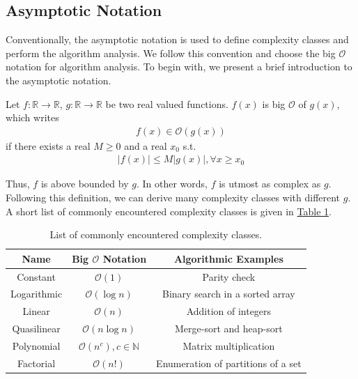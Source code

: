 \subsection*{Asymptotic Notation}
Conventionally, the asymptotic notation is used to define complexity classes and perform the algorithm analysis. 
We follow this convention and choose the big $\mathcal{O}$ notation for algorithm analysis. To begin with, we present a brief
introduction to the asymptotic notation.
\begin{definition}
    Let $f: \mathbb{R} \rightarrow \mathbb{R}$, $g: \mathbb{R} \rightarrow \mathbb{R}$ be two real valued functions. 
    $f(x)$ is big $\mathcal{O}$ of $g(x)$, which writes
    \begin{align*}
        f(x) \in \mathcal{O}(g(x))
    \end{align*}
    if there exists a real $M \geq 0$ and a real $x_0$ s.t. 
    \begin{align*}
        |f(x)| \leq M |g(x)|, \forall x \geq x_0
    \end{align*}
\end{definition}
Thus, $f$ is above bounded by $g$. In other words, $f$ is utmost as complex as $g$. Following this definition, 
we can derive many complexity classes with different $g$. A short list of commonly encountered complexity classes is given 
in \hyperref[table:1]{Table 1}.
\begin{table}[H]
    \centering 
    \begin{tabular}{|| c | c | c ||}
        \hline 
        Name & Big $\mathcal{O}$ Notation & Algorithmic Examples \\ 
        \hline 
        Constant & $\mathcal{O}(1)$ & Parity check\\
        \hline 
        Logarithmic & $\mathcal{O}(\log n)$ & Binary search in a sorted array \\ 
        \hline 
        Linear & $\mathcal{O}(n)$ & Addition of integers \\
        \hline 
        Quasilinear & $\mathcal{O}(n\log n)$ & Merge-sort and heap-sort \\
        \hline 
        Polynomial & $\mathcal{O} (n^c), c \in \mathbb{N}$ & Matrix multiplication \\
        \hline 
        Factorial & $\mathcal{O} (n!)$ & Enumeration of partitions of a set\\
        \hline 
    \end{tabular}
    \caption{List of commonly encountered complexity classes.}
    \label{table:1}
\end{table}

